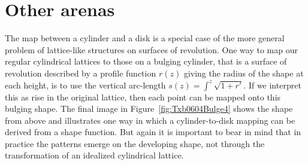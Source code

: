 \section{Other arenas}
The map between a cylinder and a disk is a special case of the more general problem of lattice-like structures on surfaces of revolution. One way to map our regular cylindrical lattices to those on a bulging cylinder, that is a surface of revolution described by a profile function $r(z)$ giving the radius of the shape at each height, is to use the vertical arc-length $s(z)=\int^z \sqrt{1+r'}$.  If we interpret this as rise in the original lattice, then each point can be mapped 
onto this bulging shape. The final image in Figure~\ref{fig:Txb0604Bulge4} shows the shape from above and illustrates 
one way in which a cylinder-to-disk mapping can be derived from a shape function. But again it is important to bear in mind that in practice the patterns emerge on the developing shape, not through the transformation of an idealized cylindrical lattice. 

